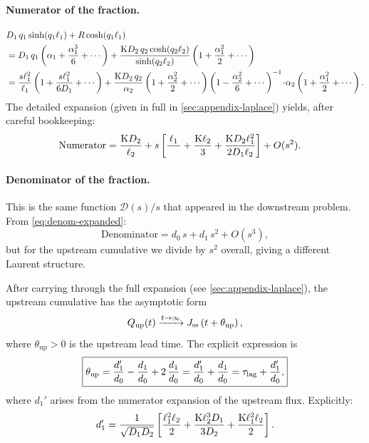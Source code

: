 \paragraph{Numerator of the fraction.}
\begin{align}
  &D_{1}\,q_1\sinh(q_1\ell_{1}) + R\cosh(q_1\ell_{1})
  \notag\\
  &= D_{1}\,q_1\left(\alpha_1 + \frac{\alpha_1^3}{6}+\cdots\right)
    + \frac{\mathrm{K}D_{2}\,q_2\cosh(q_2\ell_{2})}{\sinh(q_2\ell_{2})}
    \left(1+\frac{\alpha_1^2}{2}+\cdots\right)
  \notag\\
  &= \frac{s\ell_{1}^2}{\ell_{1}}\left(1+\frac{s\ell_{1}^2}{6D_{1}}+\cdots\right)
    + \frac{\mathrm{K}D_{2}\,q_2}{\alpha_2}
    \left(1+\frac{\alpha_2^2}{2}+\cdots\right)
    \left(1-\frac{\alpha_2^2}{6}+\cdots\right)^{-1}\!
    \cdot\!\alpha_2
    \left(1+\frac{\alpha_1^2}{2}+\cdots\right).
\end{align}
The detailed expansion (given in full in \cref{sec:appendix-laplace}) yields,
after careful bookkeeping:
\begin{align}
  \text{Numerator} &= \frac{\Kpart\Ds{2}}{\Ls{2}}
    + s\left[\frac{\Ls{1}}{\phantom{\Ds{1}}}
    + \frac{\Kpart\Ls{2}}{3}
    + \frac{\Kpart\Ds{2}\Ls{1}^2}{2\Ds{1}\Ls{2}}\right]
    + O(s^2).
\end{align}
\paragraph{Denominator of the fraction.}
This is the same function $\mathcal{D}(s)/s$ that appeared in the downstream
problem.  From \cref{eq:denom-expanded}:
\begin{equation}
  \text{Denominator} = d_0\,s + d_1\,s^2 + O(s^3),
\end{equation}
but for the upstream cumulative we divide by $s^2$ overall, giving a
different Laurent structure.

After carrying through the full expansion (see
\cref{sec:appendix-laplace}), the upstream cumulative has the asymptotic form
\begin{equation}
  \label{eq:Qup-asymptote-two-layer}
  Q_{\mathrm{up}}(t) \xrightarrow{t\to\infty}
  J_{\mathrm{ss}}\left(t + \theta_{\mathrm{up}}\right),
\end{equation}
where $\theta_{\mathrm{up}} > 0$ is the upstream lead time.  The explicit
expression is
\begin{equation}
  \label{eq:theta-up-two-layer}
  \boxed{
  \theta_{\mathrm{up}} = \frac{d_1'}{d_0} - \frac{d_1}{d_0} + 2\,\frac{d_1}{d_0}
  = \frac{d_1'}{d_0} + \frac{d_1}{d_0} = \tau_{\mathrm{lag}} + \frac{d_1'}{d_0},}
\end{equation}
where $d_1'$ arises from the numerator expansion of the upstream flux.
Explicitly:
\begin{equation}
  \label{eq:d1prime}
  d_1' = \frac{1}{\sqrt{D_{1}D_{2}}}
  \left[\frac{\ell_{1}^2\ell_{2}}{2}
  + \frac{\mathrm{K}\ell_{2}^3D_{1}}{3D_{2}}
  + \frac{\mathrm{K}\ell_{1}^2\ell_{2}}{2}
  \right].
\end{equation}

